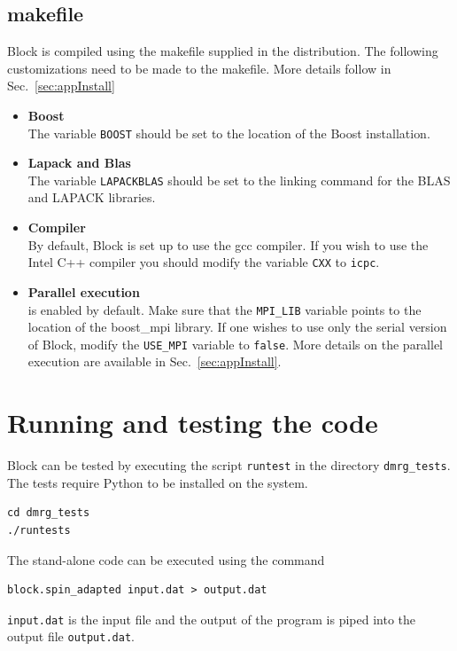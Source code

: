 \documentclass[letterpaper,12pt,aps, pra]{revtex4-1}
\begin{document}
\subsection{makefile}
Block is compiled using the makefile supplied in the distribution. The following customizations need to be made to the makefile. More details follow in Sec.~\ref{sec:appInstall}
\begin{itemize}
 \item \textbf{Boost}\\The variable \texttt{BOOST} should be set to the location of the Boost installation. 
\item \textbf{Lapack and Blas}\\ The variable \texttt{LAPACKBLAS} should be
set to the linking command for the BLAS and LAPACK libraries.
\item \textbf{Compiler}\\
   By default, Block is set up to use the gcc compiler. If you wish to use the Intel C++ compiler you should modify the variable \texttt{CXX} to \texttt{icpc}.
\item \textbf{Parallel execution}\\
	is enabled by default. Make sure that the \texttt{MPI\_LIB} variable points to the location of the boost\_mpi library. If one wishes to use only the serial version of Block, modify the \texttt{USE\_MPI} variable to \texttt{false}. More details on the parallel execution are available in Sec.~\ref{sec:appInstall}.
\end{itemize}

\section{Running and testing the code}
Block can be tested by executing the script \texttt{runtest} in the  directory \texttt{dmrg\_tests}. The tests require Python to be installed on the system.
\begin{verbatim}
cd dmrg_tests
./runtests
\end{verbatim}

The stand-alone code can be executed using the command
\begin{verbatim}
block.spin_adapted input.dat > output.dat
\end{verbatim}
\texttt{input.dat} is the input file and the output of the program is piped 
into the output file \texttt{output.dat}.

\end{document}
